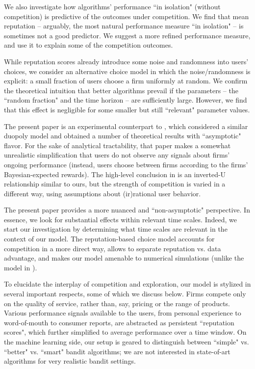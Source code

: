 \documentclass[../competing_bandits_with_appendix.tex]{subfiles}
\begin{document}
We also investigate how algorithms' performance ``in isolation" (without competition) is predictive of the outcomes under competition. We find that mean reputation -- arguably, the most natural performance measure ``in isolation" -- is sometimes not a good predictor. We suggest a
more refined performance measure, and use it to explain some of the competition outcomes.

While reputation scores already introduce some noise and randomness into users' choices, we consider an alternative choice model in which the noise/randomness is explicit: a small fraction of users choose a firm uniformly at random. We confirm the theoretical intuition that better algorithms prevail if the parameters -- the ``random fraction" and the time horizon -- are sufficiently large. However, we find that this effect is negligible for some smaller but still ``relevant" parameter values.

The present paper is an experimental counterpart to \cite{CompetingBandits-itcs18}, which considered a similar duopoly model and obtained a number of theoretical results with ``asymptotic" flavor. For the sake of analytical tractability, that paper makes a somewhat unrealistic simplification that users do not observe any signals about firms' ongoing performance (instead, users choose between firms according to the firms' Bayesian-expected rewards). The high-level conclusion in \cite{CompetingBandits-itcs18} is an inverted-U relationship similar to ours, but the strength of competition is varied in a different way, using assumptions about (ir)rational user behavior.

The present paper provides a more nuanced and ``non-asymptotic" perspective. In essence, we look for substantial effects within relevant time scales. Indeed, we start our investigation by determining what time scales are relevant in the context of our model. The reputation-based choice model accounts for competition in a more direct way, allows to separate reputation vs. data advantage, and makes our model amenable to numerical simulations (unlike the model in \cite{CompetingBandits-itcs18}).

To elucidate the interplay of competition and exploration, our model is stylized in several important  respects, some of which we discuss below. Firms compete only on the quality of service, rather than, say, pricing or the range of products. Various performance signals available to the users, from personal experience to word-of-mouth to consumer reports, are abstracted as persistent ``reputation scores", which further simplified to average performance over a time window.  On the machine learning side, our setup is geared to distinguish between ``simple" vs. ``better" vs. ``smart" bandit algorithms; we are not interested in state-of-art algorithms for very realistic bandit settings.
\end{document}
